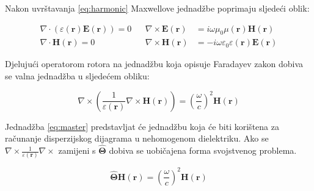 \documentclass[utf8, seminar]{fer}
\begin{document}
Nakon uvrštavanja \ref{eq:harmonic} Maxwellove jednadžbe poprimaju sljedeći
oblik:

\begin{align} \label{eq:maxwell3}
	\nabla \cdot (\varepsilon(\mathbf{r}) \mathbf{E}(\mathbf{r})) = 0 &&
	\nabla \times \mathbf{E}(\mathbf{r}) &=
		i \omega \mu_0 \mu(\mathbf{r})\mathbf{H}(\mathbf{r})  \nonumber \\
	\nabla \cdot \mathbf{H}(\mathbf{r}) = 0 &&
	\nabla \times \mathbf{H}(\mathbf{r}) &=
		- i \omega \varepsilon_0 \varepsilon(\mathbf{r})\mathbf{E}(\mathbf{r})
\end{align}

Djelujući operatorom rotora na jednadžbu koja opisuje Faradayev zakon dobiva
se valna jednadžba u sljedećem obliku:

\begin{equation} \label{eq:master}
	\nabla \times \left(\frac{1}{\varepsilon(\mathbf{r})}\nabla
			\times \mathbf{H}(\mathbf{r}) \right)
	= \left( \frac{\omega}{c} \right)^2 \mathbf{H}(\mathbf{r})
\end{equation}

Jednadžba \ref{eq:master} predstavljat će jednadžbu koja će biti korištena za
računanje disperzijskog dijagrama u nehomogenom dielektriku.
Ako se ${\nabla \times \frac{1}{\varepsilon(\mathbf{r})} \nabla \times}$
zamijeni s $\hat{\mathbf{\Theta}}$ dobiva se uobičajena forma svojstvenog
problema.

\begin{equation}
	\hat{\mathbf{\Theta}} \mathbf{H}(\mathbf{r}) =
		\left( \frac{\omega}{c} \right)^2 \mathbf{H}(\mathbf{r})
\end{equation}
\end{document}
